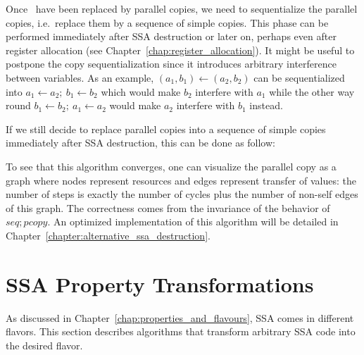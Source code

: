 Once \phifuns\ have been replaced by parallel copies, we need to sequentialize the parallel copies, i.e.\ replace them by a sequence of simple copies. This phase can be performed immediately after SSA destruction or later on, perhaps even after register allocation (see Chapter~\ref{chap:register_allocation}). It might be useful to postpone the copy sequentialization since it introduces arbitrary interference between variables. As an example, $(a_1,b_1)\gets (a_2,b_2)$ can be sequentialized into $a_1\gets a_2;\ b_1\gets b_2$ which would make $b_2$ interfere with $a_1$ while the other way round $b_1\gets b_2;\ a_1\gets a_2$ would make $a_2$ interfere with $b_1$ instead.

If we still decide to replace parallel copies into a sequence of simple copies immediately after SSA destruction, this can be done as follow:

\begin{algorithm}
\end{algorithm}

To see that this algorithm converges, one can visualize the parallel copy as a graph where nodes represent resources and edges represent transfer of values: the number of steps is exactly the number of cycles plus the number of non-self edges of this graph. The correctness comes from the invariance of the behavior of $seq; pcopy$. An optimized implementation of this algorithm will be detailed in Chapter~\ref{chapter:alternative_ssa_destruction}.


\section{SSA Property Transformations}
\label{section:classical_construction_algorithm:turning}
As discussed in Chapter~\ref{chap:properties_and_flavours},
SSA comes in different flavors. 
This section describes algorithms that transform
arbitrary SSA code
into the desired flavor.

